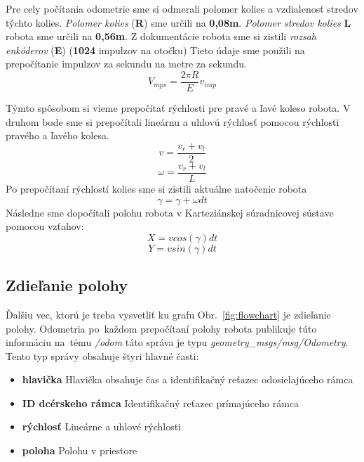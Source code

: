 Pre cely počítania odometrie sme si odmerali polomer kolies a vzdialenosť stredov týchto kolies.
\textit{Polomer kolies} (\textbf{R}) sme určili na \textbf{0,08m}. \textit{Polomer stredov kolies} \textbf{L} robota sme určili
na \textbf{0,56m}. Z dokumentácie robota \cite{encoder} sme si zistili \textit{rozsah enkóderov} (\textbf{E})
(\textbf{1024} impulzov na otočku)  Tieto údaje sme použili na prepočítanie impulzov za sekundu
na metre za sekundu.
\label{mat:vmps}
\[
	V_{mps} = \frac{2 \pi R}{E} v_{imp}
\]

Týmto spôsobom si vieme prepočítať rýchlosti pre pravé a ľavé koleso robota.
V druhom bode sme si prepočítali lineárnu a uhlovú rýchlosť pomocou rýchlosti pravého a ľavého kolesa.
\label{eq:vlin}
\[
	v = \frac{v_{r} + v_{l}}{2}
\]
\label{eq:vang}
\[
	\omega = \frac{v_{r} + v_{l}}{L}
\]
Po prepočítaní rýchlostí kolies sme si zistili aktuálne natočenie robota
\label{eq:angZ}
\[
	\gamma = \gamma + \omega dt
\]
Následne sme dopočítali polohu robota v Karteziánskej súradnicovej sústave pomocou vzťahov:
\label{eq:posX}
\[
	X = v cos(\gamma) dt
\]
\label{eq:posY}
\[
	Y = v sin(\gamma) dt
\]

\subsection{Zdieľanie polohy}
\label{sec:zdielanie_polohy}

Ďalšiu vec, ktorú je treba vysvetliť ku grafu Obr.~\ref{fig:flowchart} je zdieľanie polohy. Odometria
po~každom prepočítaní polohy robota publikuje túto informáciu na~tému \textit{/odom} táto správa je typu
\textit{geometry\_msgs/msg/Odometry}. Tento typ správy obsahuje štyri hlavné časti:
\begin{itemize}
	\item \textbf{hlavička} Hlavička obsahuje čas a identifikačný reťazec odosielajúceho rámca
	\item \textbf{ID dcérskeho rámca} Identifikačný reťazec prímajúceho rámca
	\item \textbf{rýchlosť} Lineárne a uhlové rýchlosti
	\item \textbf{poloha} Polohu v priestore
\end{itemize}

